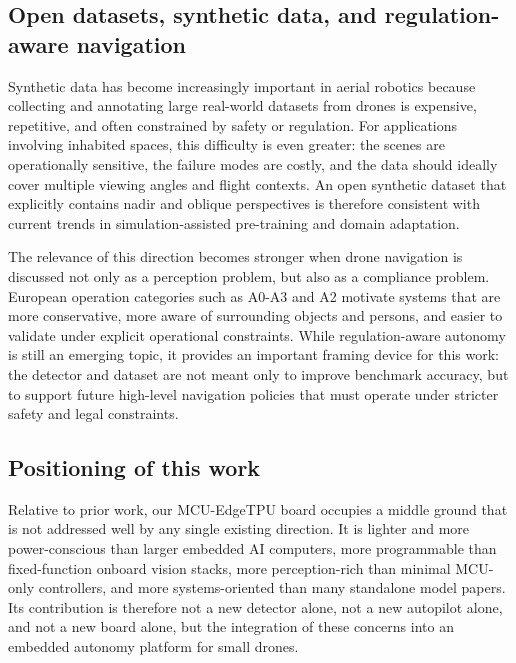 \subsection{Open datasets, synthetic data, and regulation-aware
navigation}\label{open-datasets-synthetic-data-and-regulation-aware-navigation}

Synthetic data has become increasingly important in aerial robotics
because collecting and annotating large real-world datasets from drones
is expensive, repetitive, and often constrained by safety or regulation.
For applications involving inhabited spaces, this difficulty is even
greater: the scenes are operationally sensitive, the failure modes are
costly, and the data should ideally cover multiple viewing angles and
flight contexts. An open synthetic dataset that explicitly contains
nadir and oblique perspectives is therefore consistent with current
trends in simulation-assisted pre-training and domain adaptation.

The relevance of this direction becomes stronger when drone navigation
is discussed not only as a perception problem, but also as a compliance
problem. European operation categories such as A0-A3 and A2 motivate
systems that are more conservative, more aware of surrounding objects
and persons, and easier to validate under explicit operational
constraints. While regulation-aware autonomy is still an emerging topic,
it provides an important framing device for this work: the detector and
dataset are not meant only to improve benchmark accuracy, but to support
future high-level navigation policies that must operate under stricter
safety and legal constraints.

\subsection{Positioning of this work}\label{positioning-of-this-work}

Relative to prior work, our MCU-EdgeTPU board occupies a middle ground
that is not addressed well by any single existing direction. It is
lighter and more power-conscious than larger embedded AI computers, more
programmable than fixed-function onboard vision stacks, more
perception-rich than minimal MCU-only controllers, and more
systems-oriented than many standalone model papers. Its contribution is
therefore not a new detector alone, not a new autopilot alone, and not a
new board alone, but the integration of these concerns into an embedded
autonomy platform for small drones.


